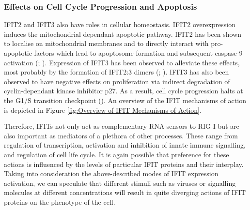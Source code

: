 \subsubsection{Effects on Cell Cycle Progression and Apoptosis} \label{Effects on Cell Cycle Progression and Apoptosis}
IFIT2 and IFIT3 also have roles in cellular homeostasis. IFIT2 overexpression induces the mitochondrial dependant apoptotic pathway. IFIT2 has been shown to localise on mitochondrial membranes and to directly interact with pro-apoptotic factors which lead to apoptosome formation and subsequent caspase-9 activation (\cite{Chen2017InhibitionApoptosis}; \cite{Diamond2013TheProteins}). Expression of IFIT3 has been observed to alleviate these effects, most probably by the formation of IFIT2:3 dimers (\cite{Mears2018BetterResponse}; \cite{Stawowczyk2011TheApoptosis}). IFIT3 has also been observed to have negative effects on proliferation via indirect degradation of cyclin-dependant kinase inhibitor p27. As a result, cell cycle progression halts at the G1/S transition checkpoint (\cite{Xiao2006RIG-GProteins}). An overview of the IFIT mechanisms of action is depicted in Figure \ref{fig:Overview of IFIT Mechanisms of Action}.

Therefore, IFITs not only act as complementary RNA sensors to RIG-I but are also important as mediators of a plethora of other processes. These range from regulation of transcription, activation and inhibition of innate immune signalling, and regulation of cell life cycle. It is again possible that preference for these actions is influenced by the levels of particular IFIT proteins and their interplay. Taking into consideration the above-described modes of IFIT expression activation, we can speculate that different stimuli such as viruses or signalling molecules at different concentrations will result in quite diverging actions of IFIT proteins on the phenotype of the cell.

